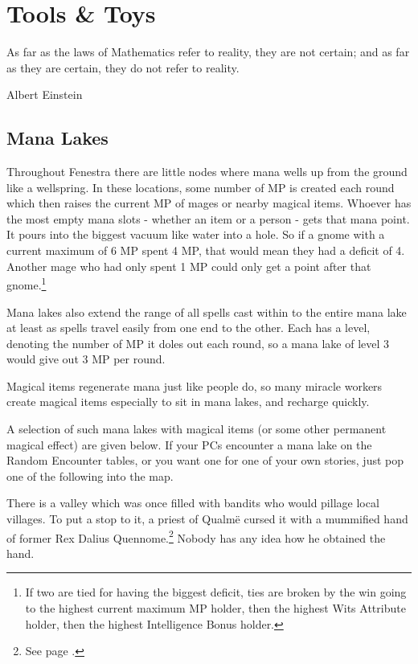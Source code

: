 \chapter{Tools \& Toys}

\epigraph{As far as the laws of Mathematics refer to reality, they are not certain; and as far as they are certain, they do not refer to reality.}{Albert Einstein}

\section{Mana Lakes}\label{mana_lake}

\begin{multicols}{2}

Throughout Fenestra there are little nodes where mana wells up from the ground like a wellspring.
In these locations, some number of MP is created each round which then raises the current MP of mages or nearby magical items.
Whoever has the most empty mana slots - whether an item or a person - gets that mana point.
It pours into the biggest vacuum like water into a hole.
So if a gnome with a current maximum of 6 MP spent 4 MP, that would mean they had a deficit of 4.
Another mage who had only spent 1 MP could only get a point after that gnome.\footnote{If two are tied for having the biggest deficit, ties are broken by the win going to the highest current maximum MP holder, then the highest Wits Attribute holder, then the highest Intelligence Bonus holder.}

Mana lakes also extend the range of all spells cast within to the entire mana lake at least as spells travel easily from one end to the other.  Each has a level, denoting the number of MP it doles out each round, so a mana lake of level 3 would give out 3 MP per round.

Magical items regenerate mana just like people do, so many miracle workers create magical items especially to sit in mana lakes, and recharge quickly.

A selection of such mana lakes with magical items (or some other permanent magical effect) are given below.
If your PCs encounter a mana lake on the Random Encounter tables, or you want one for one of your own stories, just pop one of the following into the map.


There is a valley which was once filled with bandits who would pillage local villages.
To put a stop to it, a priest of Qualm\"{e} cursed it with a mummified hand of former Rex Dalius Quennome.\footnote{See page \pageref{h_dalius}.}
Nobody has any idea how he obtained the hand.


\end{multicols}
